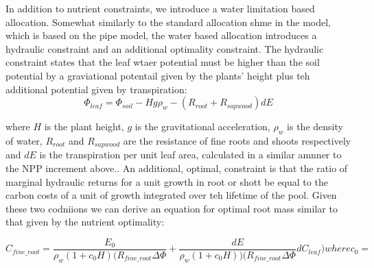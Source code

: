 In addition to nutrient constraints, we introduce a water limitation based allocation. Somewhat similarly to the standard allocation shme in the model, which is based on the pipe model, the water based allocation introduces a hydraulic constraint and an additional optimality constraint. The hydraulic constraint states that the leaf wtaer potential must be higher than the soil potential by a graviational potentail given by the plants' height plus teh additional potential given by transpiration:
\begin{equation}
 \Phi_{leaf}=\Phi_{soil} - Hg\rho_w - (R_{root}+R_{sapwood})dE
\end{equation}

where $H$ is the plant height, $g$ is the gravitational acceleration, $\rho_w$ is the density of water, $R_{root}$ and $R_{sapwood}$ are the resistance of fine roots and shoots respectively and $dE$ is the transpiration per unit leaf area, calculated in a similar amnner to the NPP increment above.. An additional, optimal, constraint is that the ratio of marginal hydraulic returns for a unit growth in root or shott be equal to the carbon costs of a unit of growth integrated over teh lifetime of the pool. Given these two codniions we can derive an equation for optimal root mass similar to that given by the nutrient optimality:

\begin{equation}
 C_{fine\_root}=\frac{E_0}{\rho_w(1+c_0H)(R_{fine\_root}\Delta\Phi} + \frac{dE}{\rho_w(1+c_0H))(R_{fine\_root}\Delta\Phi}dC_{leaf}) where
 c_0=
\end{equation}



